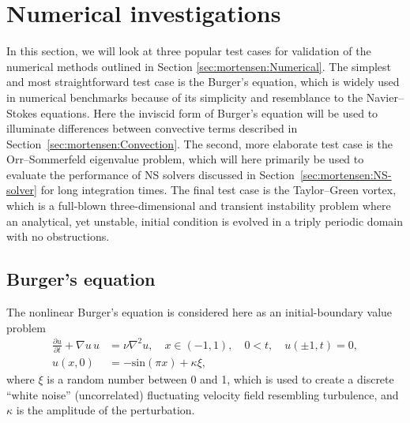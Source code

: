 \section{Numerical investigations}
\label{sec:mortensen:testcases}

In this section, we will look at three popular test cases for
validation of the numerical methods outlined in Section
\ref{sec:mortensen:Numerical}. The simplest and most straightforward
test case is the Burger's equation, which is widely used in numerical
benchmarks because of its simplicity and resemblance to the
Navier--Stokes equations. Here the inviscid form of Burger's equation
will be used to illuminate differences between convective terms
described in Section~\ref{sec:mortensen:Convection}. The second, more
elaborate test case is the Orr--Sommerfeld eigenvalue problem, which
will here primarily be used to evaluate the performance of NS solvers
discussed in Section~\ref{sec:mortensen:NS-solver} for long
integration times. The final test case is the Taylor--Green vortex,
which is a full-blown three-dimensional and transient instability
problem where an analytical, yet unstable, initial condition is
evolved in a triply periodic domain with no obstructions.

\subsection{Burger's equation}
\label{sec:mortensen:burgers}

The nonlinear Burger's equation is considered here as an
initial-boundary value problem
\begin{align}
 \frac{\partial u}{\partial t}+\nabla u \, u
  &= \nu \nabla^2 u, \quad x \in (-1,1), \quad 0<t, \quad u(\pm 1,t)=0,
\\
 u(x,0) &=-\text{sin}(\pi x)+\kappa \xi,
\label{eq:mortensen:burgers}
\end{align}
where $\xi$ is a random number between 0 and 1, which is used to
create a discrete ``white noise'' (uncorrelated) fluctuating velocity
field resembling turbulence, and $\kappa$ is the amplitude of the
perturbation.

